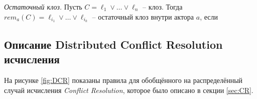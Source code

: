 \begin{definition}
	\emph{Остаточный клоз.} Пусть $C = \ell_1 \vee \ldots \vee \ell_n$ -- клоз. Тогда $rem_a(C) = \ell_{i_1} \vee \ldots \vee \ell_{i_k}$ -- остаточный клоз внутри актора $a$, если 
\end{definition}


\subsection{Описание Distributed Conflict Resolution исчисления}

На рисунке \ref{fig:DCR} показаны правила для обобщённого на распределённый случай исчисления \emph{Conflict Resolution}, которое было описано в секции \ref{sec:CR}. \par

